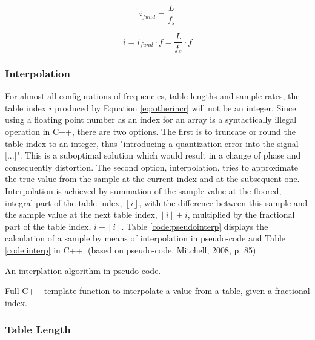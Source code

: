 \begin{equation}
  i_{fund} = \frac{L}{f_{s}}
  \label{eq:fundincr}
\end{equation}

\begin{equation}
  i = i_{fund} \cdot f = \frac{L}{f_{s}} \cdot f
  \label{eq:otherincr}
\end{equation}

\subsubsection{Interpolation}

For almost all configurations of frequencies, table lengths and sample rates, the table index $i$ produced by Equation \ref{eq:otherincr} will not be an integer. Since using a floating point number as an index for an array is a syntactically illegal operation in C++, there are two options. The first is to truncate or round the table index to an integer, thus "introducing a quantization error into the signal [...]".  This is a suboptimal solution which would result in a change of phase and consequently distortion.  The second option, interpolation, tries to approximate the true value from the sample at the current index and at the subsequent one. Interpolation is achieved by summation of the sample value at the floored, integral part of the table index, $\left \lfloor{i}\right \rfloor$, with the difference between this sample and the sample value at the next table index, $\left \lfloor {i}\right \rfloor + i$, multiplied by the fractional part of the table index, $i - \left \lfloor {i}\right \rfloor$. Table \ref{code:pseudointerp} displays the calculation of a sample by means of interpolation in pseudo-code and Table \ref{code:interp} in C++. (based on pseudo-code, Mitchell, 2008, p. 85)

\begin{table}
  \caption{An interplation algorithm in pseudo-code.}
  \label{code:pseudointerp}
\end{table}

\begin{table}
  \caption{Full C++ template function to interpolate a value from a table, given a fractional index. }
  \label{code:interp}
\end{table}

\subsubsection{Table Length}

